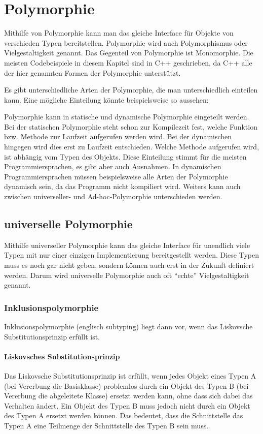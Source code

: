 \section{Polymorphie}
	Mithilfe von Polymorphie kann man das gleiche Interface für Objekte von verschieden Typen bereitstellen. Polymorphie wird
	auch Polymorphismus oder Vielgestaltigkeit genannt. Das Gegenteil von Polymorphie ist Monomorphie. Die meisten Codebeispiele
	in diesem Kapitel sind in C++ geschrieben, da C++ alle der hier genannten Formen der Polymorphie unterstützt.
	
	Es gibt unterschiedliche Arten der Polymorphie, die man unterschiedlich einteilen kann. Eine mögliche Einteilung könnte
	beispielsweise so aussehen:
	
	
	
	Polymorphie kann in statische und dynamische Polymorphie eingeteilt werden. Bei der statischen Polymorphie steht schon
	zur Kompilezeit fest, welche Funktion bzw. Methode zur Laufzeit aufgerufen werden wird. Bei der dynamischen hingegen
	wird dies erst zu Laufzeit entschieden. Welche Methode aufgerufen wird, ist abhängig vom Typen des Objekts.
	Diese Einteilung stimmt für die meisten Programmiersprachen, es gibt aber auch Ausnahmen. In dynamischen
	Programmiersprachen müssen beispielsweise alle Arten der Polymorphie dynamisch sein, da das Programm nicht kompiliert
	wird.
	Weiters kann auch zwischen universeller- und Ad-hoc-Polymorphie unterschieden werden.

	\subsection{universelle Polymorphie}
		Mithilfe universeller Polymorphie kann das gleiche Interface für unendlich viele Typen mit nur einer einzigen Implementierung bereitgestellt werden. Diese
		Typen muss es noch gar nicht geben, sondern können auch erst in der Zukunft definiert werden. Darum wird
		universelle Polymorphie auch oft ``echte'' Vielgestaltigkeit genannt.
		
		\subsubsection{Inklusionspolymorphie}
			Inklusionspolymorphie (englisch subtyping) liegt dann vor, wenn das Liskovsche Substitutionsprinzip erfüllt ist.
			
			\paragraph{Liskovsches Substitutionsprinzip}
				Das Liskovsche Substitutionsprinzip ist erfüllt, wenn jedes Objekt eines Typen A (bei Vererbung die
				Basisklasse) problemlos durch ein Objekt des Typen B (bei Vererbung die abgeleitete Klasse) ersetzt werden
				kann, ohne dass sich dabei das Verhalten ändert. Ein Objekt des Typen B muss jedoch nicht durch ein Objekt
				des Typen A ersetzt werden können. Das bedeutet, dass die Schnittstelle das Typen A eine Teilmenge der
				Schnittstelle des Typen B sein muss.
		
